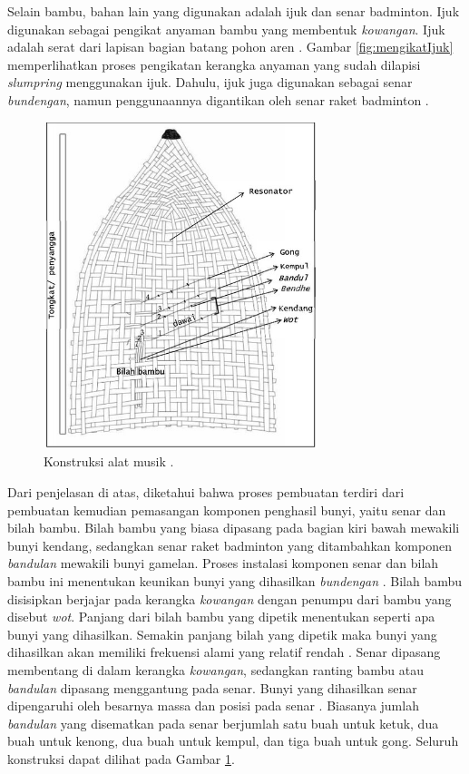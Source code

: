 Selain bambu, bahan lain yang digunakan adalah ijuk dan senar badminton. Ijuk digunakan sebagai pengikat anyaman bambu yang membentuk \textit{kowangan}. Ijuk adalah serat dari lapisan bagian batang pohon aren \cite{skripsiSaid}. Gambar \ref{fig:mengikatIjuk} memperlihatkan proses pengikatan kerangka anyaman yang sudah dilapisi \textit{slumpring} menggunakan ijuk. Dahulu, ijuk juga digunakan sebagai senar \textit{bundengan}, namun penggunaannya digantikan oleh senar raket badminton \cite{skripsiSaid}. \par 
\begin{figure}[t!]
    \centering
    \includegraphics[width=8cm]{Gambar/strukturBundengan.jpg}
    \caption{Konstruksi alat musik \bundengan \cite{skripsiSaid}.}
    \label{fig:strukturBundengan}
\end{figure}
Dari penjelasan di atas, diketahui bahwa proses pembuatan \bundengan terdiri dari pembuatan \kowangan kemudian pemasangan komponen penghasil bunyi, yaitu senar dan bilah bambu. Bilah bambu yang biasa dipasang pada bagian kiri bawah \kowangan mewakili bunyi kendang, sedangkan senar raket badminton yang ditambahkan komponen \textit{bandulan} mewakili bunyi gamelan. Proses instalasi komponen senar dan bilah bambu ini menentukan keunikan bunyi yang dihasilkan \textit{bundengan} \cite{skripsiSaid}. Bilah bambu disisipkan berjajar pada kerangka \textit{kowangan} dengan penumpu dari bambu yang disebut \textit{wot}. Panjang dari bilah bambu yang dipetik menentukan seperti apa bunyi yang dihasilkan. Semakin panjang bilah yang dipetik maka bunyi yang dihasilkan akan memiliki frekuensi alami yang relatif rendah \cite{skripsiAzfar}. Senar dipasang membentang di dalam kerangka \textit{kowangan}, sedangkan ranting bambu atau \textit{bandulan} dipasang menggantung pada senar. Bunyi yang dihasilkan senar dipengaruhi oleh besarnya massa dan posisi \bandulan pada senar \cite{illusiveSound}. Biasanya jumlah \textit{bandulan} yang disematkan pada senar berjumlah satu buah untuk ketuk, dua buah untuk kenong, dua buah untuk kempul, dan tiga buah untuk gong. Seluruh konstruksi \bundengan dapat dilihat pada Gambar \ref{fig:strukturBundengan}.  \par 


